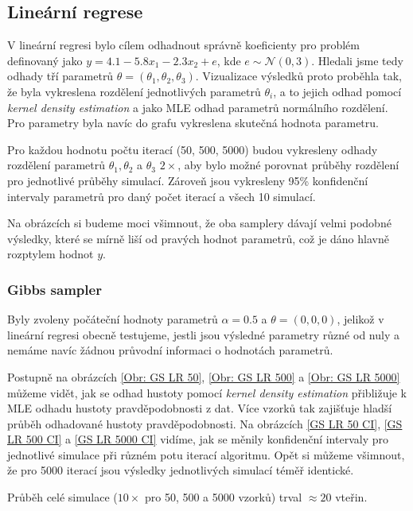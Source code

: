 \documentclass[11pt,oneside,american,czech]{article}
\newcommand{\N}{\mathcal{N}}
\begin{document}
\subsection{Lineární regrese}

V lineární regresi bylo cílem odhadnout správně koeficienty pro problém definovaný jako \linebreak $y = 4.1 - 5.8x_1 - 2.3x_2 + e$, kde $e \sim \N(0,3)$. Hledali jsme tedy odhady tří parametrů $\theta = (\theta_1, \theta_2, \theta_3)$. Vizualizace výsledků proto proběhla tak, že byla vykreslena rozdělení jednotlivých parametrů $\theta_i$, a to jejich odhad pomocí \textit{kernel density estimation} a jako MLE odhad parametrů normálního rozdělení. Pro parametry byla navíc do grafu vykreslena skutečná hodnota parametru.

Pro každou hodnotu počtu iterací (50, 500, 5000) budou vykresleny odhady rozdělení parametrů $\theta_1, \theta_2$ a $\theta_3$ $2\times$, aby bylo možné porovnat průběhy rozdělení pro jednotlivé průběhy simulací. Zároveň jsou vykresleny 95\% konfidenční intervaly parametrů pro daný počet iterací a všech 10 simulací.

Na obrázcích si budeme moci všimnout, že oba samplery dávají velmi podobné výsledky, které se mírně liší od pravých hodnot parametrů, což je dáno hlavně rozptylem hodnot $y$.

\subsubsection{Gibbs sampler}

Byly zvoleny počáteční hodnoty parametrů $\alpha = 0.5$ a  $\theta = (0, 0, 0)$, jelikož v lineární regresi obecně testujeme, jestli jsou výsledné parametry různé od nuly a nemáme navíc žádnou průvodní informaci o hodnotách parametrů.

Postupně na obrázcích \ref{Obr: GS LR 50}, \ref{Obr: GS LR 500} a \ref{Obr: GS LR 5000} můžeme vidět, jak se odhad hustoty pomocí \textit{kernel density estimation} přibližuje k MLE odhadu hustoty pravděpodobnosti z dat. Více vzorků tak zajišťuje hladší průběh odhadované hustoty pravděpodobnosti. Na obrázcích \ref{GS LR 50 CI}, \ref{GS LR 500 CI} a \ref{GS LR 5000 CI} vidíme, jak se měnily konfidenční intervaly pro jednotlivé simulace při různém potu iterací algoritmu. Opět si můžeme všimnout, že pro 5000 iterací jsou výsledky jednotlivých simulací téměř identické.

Průběh celé simulace ($10\times$ pro 50, 500 a 5000 vzorků) trval $\approx 20$ vteřin.
\end{document}
